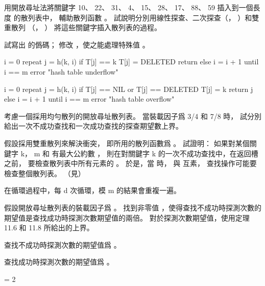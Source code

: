 \startsection[
  title={Open addressing},
]

\startEXERCISE
用開放尋址法將關鍵字 10、 22、 31、 4、 15、 28、 17、 88、 59 插入到一個長度  的散列表中，
輔助散列函數 。
試說明分別用線性探查、二次探查（， ）和雙重散列
（， ）
將這些關鍵字插入散列表的過程。
\stopEXERCISE

\startANSWER
\startcombination[3*1]
{\externalfigure[output/e11_4_1-1]}{}
{\externalfigure[output/e11_4_1-2]}{}
{\externalfigure[output/e11_4_1-3]}{}
\stopcombination
\stopANSWER

\startEXERCISE
試寫出  的僞碼；
修改 ，使之能處理特殊值 。
\stopEXERCISE

\startANSWER
{}
\startCLRS
i = 0
repeat
	j = h(k, i)
	if T[j] == k
		T[j] = DELETED
		return
	else
		i = i + 1
until i == m
error "hash table underflow"
\stopCLRS

\startCLRS
i = 0
repeat
	j = h(k, i)
	if T[j] == NIL or T[j] == DELETED
		T[j] = k
		return j
	else
		i = i + 1
until i == m
error "hash table overflow"
\stopCLRS
\stopANSWER

\startEXERCISE
考慮一個採用均勻散列的開放尋址散列表。
當裝載因子爲 3/4 和 7/8 時，
試分別給出一次不成功查找和一次成功查找的探查期望數上界。
\stopEXERCISE

\startANSWER
\startformula\startmathalignment[%
  m=3, n=1,
  align={middle,middle,middle},
  distance=2em]
\NC \NC {} \NC {} \NR
\NC {}   \NR
\NC {}\ln{}
    \NC {}
    \NC {} \NR
\stopmathalignment\stopformula
\stopANSWER

\startEXERCISE\DIFFICULT
假設採用雙重散列來解決衝突，
即所用的散列函數爲 。
試證明：
如果對某個關鍵字 k， m 和  有最大公約數 ，
則在對關鍵字 k 的一次不成功查找中，在返回槽  之前，
要檢查散列表中所有元素的 。
於是，當  時，  與  互素，
查找操作可能要檢查整個散列表。
（\hint 見）
\stopEXERCISE

\startANSWER
在循環過程中，每 d 次循環，模 m 的結果會重複一遍。
\stopANSWER

\startEXERCISE\DIFFICULT
假設開放尋址散列表的裝載因子爲 \m{\alpha}。
找到非零值 \m{\alpha}，使得查找不成功時探測次數的期望值是查找成功時探測次數期望值的兩倍。
對於探測次數期望值，使用定理 11.6 和 11.8 所給出的上界。
\stopEXERCISE

\startANSWER
查找不成功時探測次數的期望值爲 。

查找成功時探測次數的期望值爲 。

\startformula
{} = 2 \ln{}
\stopformula
\stopANSWER

\stopsection
